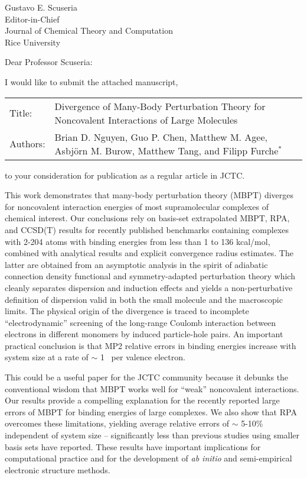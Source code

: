 \documentclass[12pt]{letter}
\begin{document}
\date{\today}


\begin{letter}{Gustavo E. Scuseria \\
    Editor-in-Chief \\
    Journal of Chemical Theory and Computation \\
    Rice University \\
    }


\opening{Dear Professor Scuseria:}
\thispagestyle{uciletter}
I would like to submit the attached manuscript,

\begin{center}
  \begin{tabularx}{\textwidth}{lX}
    Title: & Divergence of Many-Body Perturbation Theory for Noncovalent
  Interactions of Large Molecules \\
    Authors: & Brian D. Nguyen, Guo P. Chen, Matthew M. Agee, Asbj{\"o}rn
    M. Burow, Matthew Tang, and Filipp Furche$^*$ \\
  \end{tabularx}
\end{center}
to your consideration for publication as a regular article in JCTC.

This work demonstrates that many-body perturbation theory (MBPT) diverges for
noncovalent interaction energies of most supramolecular complexes of
chemical interest. Our conclusions rely on basis-set extrapolated MBPT,
RPA, and CCSD(T) results for recently published benchmarks containing
complexes with 2-204 atoms with binding energies from less than 1 to 136
kcal/mol, combined with analytical results and explicit convergence radius
estimates. The latter are obtained from an asymptotic analysis in the
spirit of adiabatic connection density functional and symmetry-adapted
perturbation theory which cleanly separates dispersion and induction
effects and yields a non-perturbative definition of dispersion valid in
both the small molecule and the macroscopic limits. The physical origin
of the divergence is traced to incomplete ``electrodynamic'' screening
of the long-range Coulomb interaction between electrons in different
monomers by induced particle-hole pairs. An important practical
conclusion is that MP2 relative errors in binding energies increase
with system size at a rate of $\sim$ 1 \textperthousand\, per valence
electron.

This could be a useful paper for the JCTC community
because it debunks the conventional wisdom that MBPT works well for
``weak'' noncovalent interactions. Our results provide a compelling
explanation for the recently reported large errors of MBPT for binding
energies of large complexes. We also show that RPA overcomes these
limitations, yielding average relative errors of $\sim$ 5-10\% independent
of system size -- significantly less than previous studies using smaller
basis sets have reported. These results have important implications for
computational practice and for the development of \textit{ab initio}
and semi-empirical electronic structure methods.


\end{letter}
\end{document}
